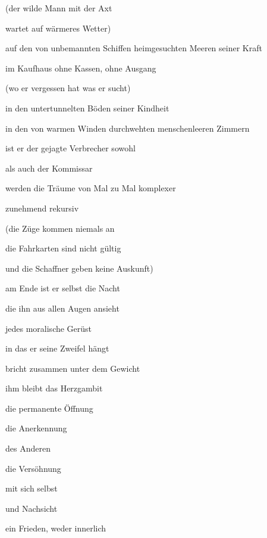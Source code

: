 (der wilde Mann mit der Axt

wartet auf wärmeres Wetter)


\bigskip

auf den von unbemannten Schiffen heimgesuchten Meeren seiner Kraft


\bigskip

im Kaufhaus ohne Kassen, ohne Ausgang


\bigskip

(wo er vergessen hat was er sucht)


\bigskip

in den untertunnelten Böden seiner Kindheit


\bigskip

in den von warmen Winden durchwehten menschenleeren Zimmern 


\bigskip

ist er der gejagte Verbrecher sowohl

als auch der Kommissar


\bigskip

werden die Träume von Mal zu Mal komplexer

zunehmend rekursiv


\bigskip

(die Züge kommen niemals an

die Fahrkarten sind nicht gültig

und die Schaffner geben keine Auskunft)


\bigskip


\bigskip


\bigskip

am Ende ist er selbst die Nacht

die ihn aus allen Augen ansieht


\bigskip

jedes moralische Gerüst

in das er seine Zweifel hängt

bricht zusammen unter dem Gewicht


\bigskip

ihm bleibt das Herzgambit

die permanente Öffnung

die Anerkennung

des Anderen

die Versöhnung

mit sich selbst

und Nachsicht


\bigskip

ein Frieden, weder innerlich 

